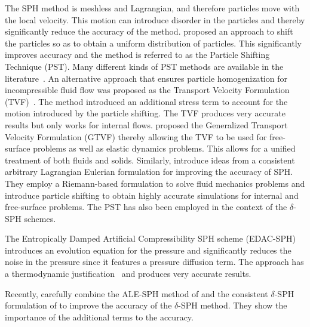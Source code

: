 


The SPH method is meshless and Lagrangian, and therefore particles move with the
local velocity. This motion can introduce disorder in the particles and thereby
significantly reduce the accuracy of the method. \textcite{acc_stab_xu:jcp:2009}
proposed an approach to shift the particles so as to obtain a uniform
distribution of particles. This significantly improves accuracy and the method
is referred to as the Particle Shifting Technique (PST). Many different kinds of
PST methods are available in the
literature~\parencite{diff_smoothing_sph:lind:jcp:2012,fickian_smoothing_sph:skillen:cmame:2013,huang_kernel_2019,ye2019sph}.
An alternative approach that ensures particle homogenization for incompressible
fluid flow was proposed as the Transport Velocity Formulation
(TVF)~\parencite{Adami2013}. The method introduced an additional stress term to
account for the motion introduced by the particle shifting. The TVF produces
very accurate results but only works for internal flows. \textcite{zhang_hu_adams17}
proposed the Generalized Transport Velocity Formulation (GTVF) thereby allowing
the TVF to be used for free-surface problems as well as elastic dynamics
problems. This allows for a unified treatment of both fluids and solids.
Similarly, \textcite{oger_ale_sph_2016} introduce ideas from a consistent arbitrary
Lagrangian Eulerian formulation for improving the accuracy of SPH. They employ a
Riemann-based formulation to solve fluid mechanics problems and introduce
particle shifting to obtain highly accurate simulations for internal and
free-surface problems. The PST has also been employed in the
context of the $\delta$-SPH schemes\parencite{sun_consistent_2019}.


The Entropically Damped Artificial Compressibility SPH scheme
(EDAC-SPH)~\parencite{edac-sph:cf:2019} introduces an evolution equation for the
pressure and significantly reduces the noise in the pressure since it features
a pressure diffusion term. The approach has a thermodynamic
justification~\parencite{Clausen2013} and produces very accurate
results.


Recently, \textcite{antuono2021delta} carefully combine the ALE-SPH method of
\textcite{oger_ale_sph_2016} and the consistent $\delta$-SPH formulation of
\textcite{sun_consistent_2019} to improve the accuracy of the $\delta$-SPH
method. They show the importance of the additional terms to the accuracy.


